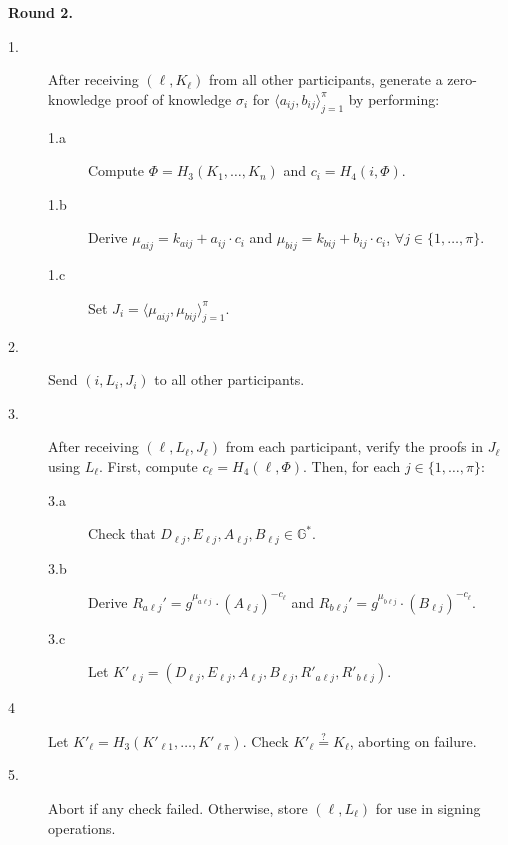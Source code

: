 \noindent \textbf{Round 2.}
\begin{description}
    \item[1.] After receiving $(\ell, K_\ell)$ from all other participants,
    generate a zero-knowledge proof of knowledge $\sigma_i$ for
    $\langle a_{ij}, b_{ij}\rangle_{j=1}^\pi$ by performing:
  \begin{description}
    \item[1.a] Compute $\Phi = H_3(K_1, \dots, K_n)$ and $c_i = H_4(i, \Phi)$.
    \item[1.b] Derive $\mu_{aij} = k_{aij} + a_{ij}\cdot c_{i}$ and
                      $\mu_{bij} = k_{bij} + b_{ij}\cdot c_{i}$,
                      $\forall j \in \{1,\dots,\pi\}$.
    \item[1.c] Set $J_i = \langle \mu_{aij}, \mu_{bij}\rangle_{j=1}^\pi$.
  \end{description}
\item[2.]Send $(i, L_i, J_i)$ to all other participants.
\item[3.] After receiving $(\ell, L_\ell, J_\ell)$ from each
  participant, verify the proofs in $J_\ell$ using $L_\ell$. First,
  compute $c_\ell = H_4(\ell, \Phi)$. Then, for each $j \in \{1,\dots,\pi\}$:
  \begin{description}
    \item[3.a] Check that $D_{\ell j}, E_{\ell j}, A_{\ell j}, B_{\ell j} \in \mathbb{G}^*$.
    \item[3.b] Derive
    $R_{a \ell j}' = g^{\mu_{a \ell j}} \cdot (A_{\ell j})^{-c_\ell}$ and
    $R_{b \ell j}' = g^{\mu_{b \ell j}} \cdot (B_{\ell j})^{-c_\ell}$.
    \item[3.c] Let $K'_{\ell j} = (D_{\ell j}, E_{\ell j}, A_{\ell j}, B_{\ell j},
    R'_{a \ell j}, R'_{b \ell j})$.
  \end{description}
  \item[4] Let $K'_\ell  = H_3(K'_{\ell 1}, \dots, K'_{\ell \pi})$.
  Check $K'_\ell \stackrel{?}{=} K_\ell$, aborting on failure.
  \item[5.] Abort if any check failed. Otherwise,
  store $(\ell, L_\ell)$ for use in signing operations.
\end{description}
